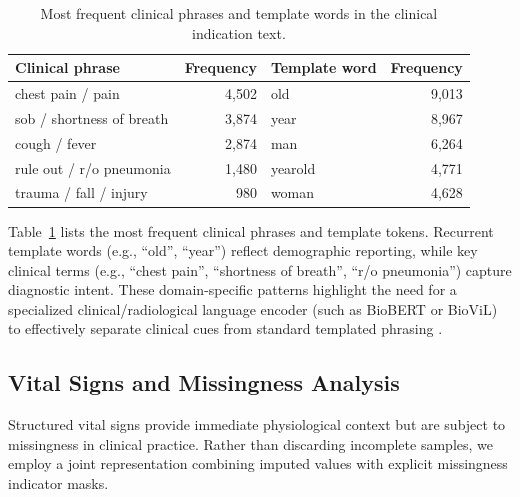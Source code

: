 \begin{table}[H]
    \centering
    \caption[Most frequent clinical terms and templates in the indication text]{Most frequent clinical phrases and template words in the clinical indication text.}
    \label{tab:common_text_terms}
    \begin{tabular}{lrlr}
        \hline
        Clinical phrase & Frequency & Template word & Frequency \\
        \hline
        chest pain / pain & 4,502 & old & 9,013 \\
        sob / shortness of breath & 3,874 & year & 8,967 \\
        cough / fever & 2,874 & man & 6,264 \\
        rule out / r/o pneumonia & 1,480 & yearold & 4,771 \\
        trauma / fall / injury & 980 & woman & 4,628 \\
        \hline
    \end{tabular}
\end{table}

Table~\ref{tab:common_text_terms} lists the most frequent clinical phrases and template tokens. Recurrent template words (e.g., ``old'', ``year'') reflect demographic reporting, while key clinical terms (e.g., ``chest pain'', ``shortness of breath'', ``r/o pneumonia'') capture diagnostic intent. These domain-specific patterns highlight the need for a specialized clinical/radiological language encoder (such as BioBERT or BioViL) to effectively separate clinical cues from standard templated phrasing \cite{boecking2022biovil}.

\subsection{Vital Signs and Missingness Analysis}
\label{subsec:eda_vitals}

Structured vital signs provide immediate physiological context but are subject to missingness in clinical practice. Rather than discarding incomplete samples, we employ a joint representation combining imputed values with explicit missingness indicator masks.


